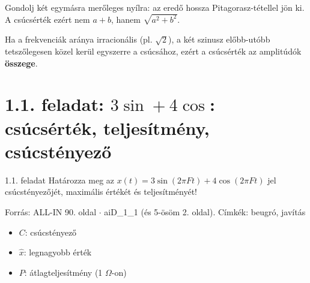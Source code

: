 \begin{center}\end{center}

Gondolj két egymásra merőleges nyílra: az eredő hossza Pitagorasz-tétellel jön ki. A csúcsérték ezért nem $a+b$, hanem $\sqrt{a^2+b^2}$.

Ha a frekvenciák aránya irracionális (pl. $\sqrt2$), a két szinusz előbb-utóbb tetszőlegesen közel kerül egyszerre a csúcsához, ezért a csúcsérték az amplitúdók \textbf{összege}.

\section{\texorpdfstring{1.1. feladat: $3\sin+4\cos$: csúcsérték, teljesítmény, csúcstényező}{1.1. feladat: 3sin+4cos: csúcsérték, teljesítmény, csúcstényező}}\label{ai1_01}
\setcounter{lepes}{0}
\begin{feladat}{1.1. feladat}
Határozza meg az $x(t)=3\sin(2\pi Ft)+4\cos(2\pi Ft)$ jel csúcstényezőjét, maximális értékét és teljesítményét!

{\footnotesize\sffamily Forrás: ALL-IN 90. oldal $\cdot$ aiD\_1\_1 (és 5-ösöm 2. oldal). Címkék: beugró, javítás}
\end{feladat}
\begin{keresunk}
\begin{itemize}
\item $C$: csúcstényező
\item $\hat x$: legnagyobb érték
\item $P$: átlagteljesítmény (1 $\Omega$-on)
\end{itemize}
\end{keresunk}
